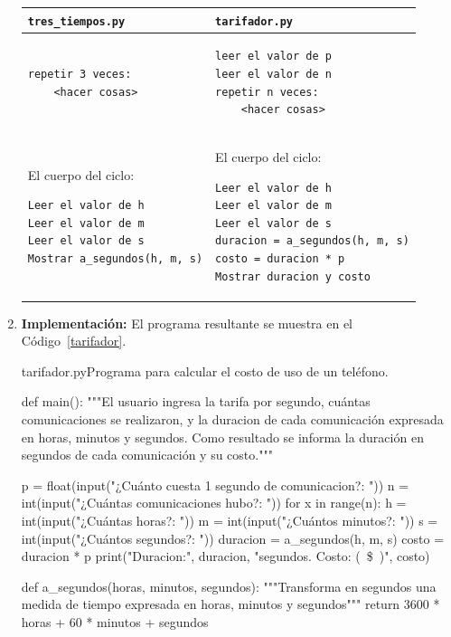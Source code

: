 \begin{solucion}
\begin{enumerate}
\begin{center}
\begin{tabular}{p{} p{}}
\lstinline!tres_tiempos.py! & \lstinline!tarifador.py!
\\
\hline
\begin{verbatim}
repetir 3 veces:
    <hacer cosas>
\end{verbatim}
&
\begin{verbatim}
leer el valor de p
leer el valor de n
repetir n veces:
    <hacer cosas>
\end{verbatim}
\\
\hline
El cuerpo del ciclo:
{\footnotesize
\begin{verbatim}
Leer el valor de h
Leer el valor de m
Leer el valor de s
Mostrar a_segundos(h, m, s)
\end{verbatim}
} &
El cuerpo del ciclo:
{\footnotesize
\begin{verbatim}
Leer el valor de h
Leer el valor de m
Leer el valor de s
duracion = a_segundos(h, m, s)
costo = duracion * p
Mostrar duracion y costo
\end{verbatim}
} \\
\end{tabular}
\end{center}

\item {\bf Implementación:} El programa resultante se muestra en el Código~\ref{tarifador}.

\begin{codigo}{\label{tarifador} tarifador.py}{Programa para calcular el costo
    de uso de un teléfono.}
\begin{codigo-python}
def main():
    """El usuario ingresa la tarifa por segundo, cuántas
       comunicaciones se realizaron, y la duracion de cada
       comunicación expresada en horas, minutos y segundos. Como
       resultado se informa la duración en segundos de cada
       comunicación y su costo."""

    p = float(input("¿Cuánto cuesta 1 segundo de comunicacion?: "))
    n = int(input("¿Cuántas comunicaciones hubo?: "))
    for x in range(n):
        h = int(input("¿Cuántas horas?: "))
        m = int(input("¿Cuántos minutos?: "))
        s = int(input("¿Cuántos segundos?: "))
        duracion = a_segundos(h, m, s)
        costo = duracion * p
        print("Duracion:", duracion, "segundos. Costo: (~\$~)", costo)

def a_segundos(horas, minutos, segundos):
    """Transforma en segundos una medida de tiempo expresada en
       horas, minutos y segundos"""
	return 3600 * horas + 60 * minutos + segundos


\end{codigo-python}
\end{codigo}
\end{enumerate}
\end{solucion}
